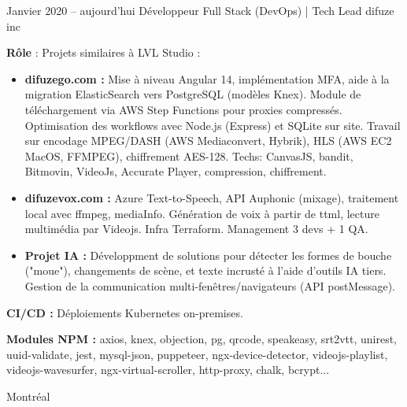 \documentclass[
  a4paper,
   maincolor=cvblue,
   sectioncolor=cvblue,
   sidebarwidth=0.323\paperwidth,
]{fortysecondscv}
\begin{document}
\newpage
\restoregeometry
{}\paperwidth

\makefrontsidebar

\vspace*{-3.5em} %



\begin{cvtableNew}
  \cvitemRightNew
  {Janvier 2020 – aujourd’hui} %
  {Développeur Full Stack (DevOps) | Tech Lead} %
  {difuze inc} %
  {
    \vspace{0.1pt}
    \fontsize{10.8pt}{12pt}\selectfont
    \textbf{Rôle} : Projets similaires à LVL Studio :\vspace{5pt}

    \begin{itemize}[itemsep=-1mm, topsep=0pt, leftmargin=8pt]
      \item \textbf{difuzego.com :} Mise à niveau Angular 14, implémentation MFA, aide à la migration ElasticSearch vers PostgreSQL (modèles Knex). Module de téléchargement via AWS Step Functions pour proxies compressés. Optimisation des workflows avec Node.js (Express) et SQLite sur site. Travail sur encodage MPEG/DASH (AWS Mediaconvert, Hybrik), HLS (AWS EC2 MacOS, FFMPEG), chiffrement AES-128. Techs: CanvasJS, bandit, Bitmovin, VideoJs, Accurate Player, compression, chiffrement.\vspace{5pt}
      \item \textbf{difuzevox.com :} Azure Text-to-Speech, API Auphonic (mixage), traitement local avec ffmpeg, mediaInfo. Génération de voix à partir de ttml, lecture multimédia par Videojs. Infra Terraform. Management 3 devs + 1 QA.\vspace{5pt}
      \item \textbf{Projet IA :} Développment de solutions pour détecter les formes de bouche ("moue"), changements de scène, et texte incrusté à l'aide d'outils IA tiers. Gestion de la communication multi-fenêtres/navigateurs (API postMessage).\vspace{5pt}
    \end{itemize}

    \textbf{CI/CD :} Déploiements Kubernetes on-premises.\vspace{5pt}

    \textbf{Modules NPM :} axios, knex, objection, pg, qrcode, speakeasy, srt2vtt, unirest, uuid-validate, jest, mysql-json, puppeteer, ngx-device-detector, videojs-playlist, videojs-wavesurfer, ngx-virtual-scroller, http-proxy, chalk, bcrypt...
  }
  {Montréal} %


\end{cvtableNew}
\end{document}
